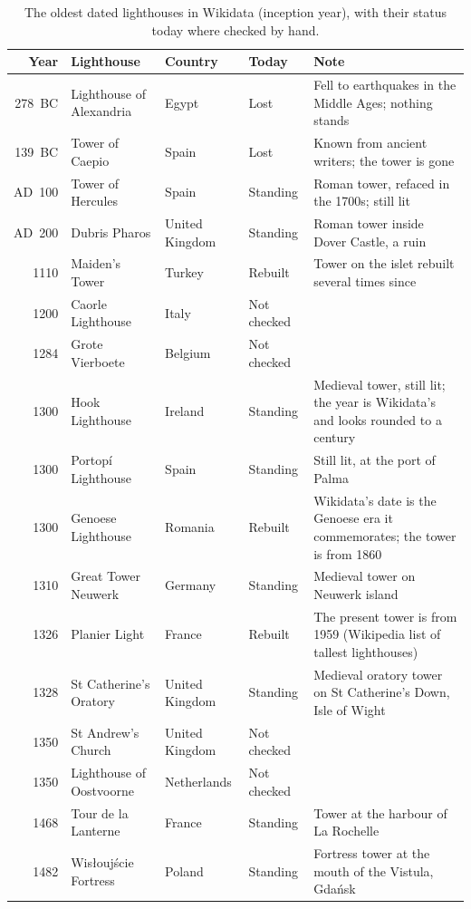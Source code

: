 \documentclass[11pt,a4paper]{article}
\begin{document}
\begin{table}[tbp]\centering\footnotesize\caption{The oldest dated lighthouses in Wikidata (inception year), with their status today where checked by hand.}\label{tab:oldest}\begin{tabular}{rp{3.8cm}p{2.4cm}lp{5.0cm}}\toprule Year & Lighthouse & Country & Today & Note\\\midrule
278~BC & Lighthouse of Alexandria & Egypt & Lost & Fell to earthquakes in the Middle Ages; nothing stands\\
139~BC & Tower of Caepio & Spain & Lost & Known from ancient writers; the tower is gone\\
AD~100 & Tower of Hercules & Spain & Standing & Roman tower, refaced in the 1700s; still lit\\
AD~200 & Dubris Pharos & United Kingdom & Standing & Roman tower inside Dover Castle, a ruin\\
1110 & Maiden's Tower & Turkey & Rebuilt & Tower on the islet rebuilt several times since\\
1200 & Caorle Lighthouse & Italy & Not checked & \\
1284 & Grote Vierboete & Belgium & Not checked & \\
1300 & Hook Lighthouse & Ireland & Standing & Medieval tower, still lit; the year is Wikidata's and looks rounded to a century\\
1300 & Portopí Lighthouse & Spain & Standing & Still lit, at the port of Palma\\
1300 & Genoese Lighthouse & Romania & Rebuilt & Wikidata's date is the Genoese era it commemorates; the tower is from 1860\\
1310 & Great Tower Neuwerk & Germany & Standing & Medieval tower on Neuwerk island\\
1326 & Planier Light & France & Rebuilt & The present tower is from 1959 (Wikipedia list of tallest lighthouses)\\
1328 & St Catherine's Oratory & United Kingdom & Standing & Medieval oratory tower on St Catherine's Down, Isle of Wight\\
1350 & St Andrew's Church & United Kingdom & Not checked & \\
1350 & Lighthouse of Oostvoorne & Netherlands & Not checked & \\
1468 & Tour de la Lanterne & France & Standing & Tower at the harbour of La Rochelle\\
1482 & Wisłoujście Fortress & Poland & Standing & Fortress tower at the mouth of the Vistula, Gdańsk\\

\end{tabular}
\end{table}
\end{document}
